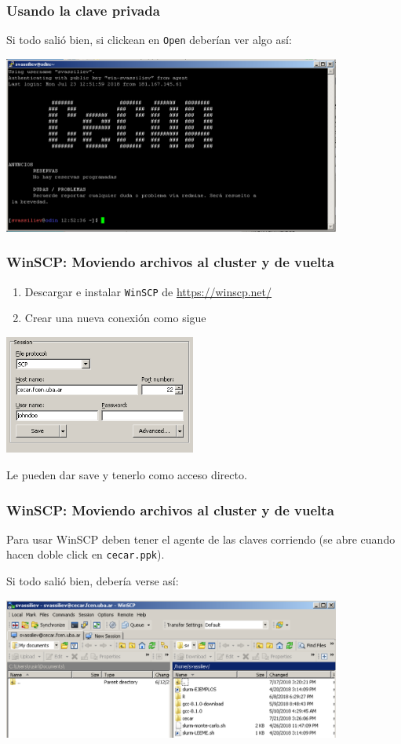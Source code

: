 \documentclass[handout]{beamer}
\begin{document}
\begin{frame}
\frametitle{Usando la clave privada}
Si todo salió bien, si clickean en \Verb=Open= deberían ver algo así:
\begin{center}
\includegraphics[width=30em]{putty-session.png}
\end{center}
\end{frame}



\begin{frame}
\frametitle{WinSCP: Moviendo archivos al cluster y de vuelta}
\begin{enumerate}
  \item Descargar e instalar \Verb=WinSCP= de \url{https://winscp.net/}
  \item Crear una nueva conexión como sigue
\end{enumerate}
\begin{center}
  \includegraphics[width=17em]{winscp-session.png}
  \end{center} 
  Le pueden dar save y tenerlo como acceso directo. 
\end{frame}


\begin{frame}
\frametitle{WinSCP: Moviendo archivos al cluster y de vuelta}
Para usar WinSCP deben tener el agente de las claves corriendo (se abre cuando hacen doble click en \Verb=cecar.ppk=).

Si todo salió bien, debería verse así:

\begin{center}
\includegraphics[width=30em]{winscp.png}
\end{center}
\end{frame}
\end{document}
